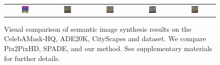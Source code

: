 \begin{figure}[]
\begin{tabular} {cc|cc|c}
\includegraphics[width=0.1932\textwidth]{Images/Rec/FACADES/label/Austria_Vienna_way175776886_Fid1698_QhErsGwv-5YJ9ZlTvv1I8w.png} & \includegraphics[width=0.1932\textwidth]{Images/Rec/FACADES/gt/Austria_Vienna_way175776886_Fid1698_QhErsGwv-5YJ9ZlTvv1I8w.jpg} &
\includegraphics[width=0.1932\textwidth]{Images/Rec/FACADES/pix2pixhd/Austria_Vienna_way175776886_Fid1698_QhErsGwv-5YJ9ZlTvv1I8w.jpg}&
\includegraphics[width=0.1932\textwidth]{Images/Rec/FACADES/spade/Austria_Vienna_way175776886_Fid1698_QhErsGwv-5YJ9ZlTvv1I8w.jpg} &  \includegraphics[width=0.1932\textwidth]{Images/Rec/FACADES/ours/Austria_Vienna_way175776886_Fid1698_QhErsGwv-5YJ9ZlTvv1I8w.png} \\


\end{tabular}
\vspace{-2mm}
	\caption{Visual  comparison  of  semantic  image  synthesis  results  on  the  CelebAMask-HQ, ADE20K, CityScapes and \Facades dataset. We compare Pix2PixHD, SPADE, and our method. See supplementary materials for further details.}
	\label{fig:Reconstruction results}	
\vspace{-3mm}	
 \end{figure}
 \egroup
 \addtolength{\tabcolsep}{4.5pt}